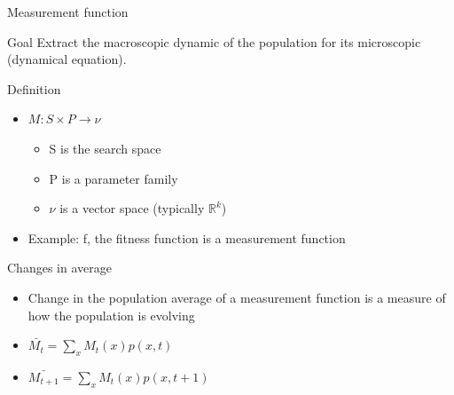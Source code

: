 \begin{frame}{Measurement function}
  \begin{block}{Goal}
    Extract the macroscopic dynamic of the population for its microscopic (dynamical equation).
  \end{block}

  \begin{block}{Definition}
    \begin{itemize}
    \item$M: S \times P \longrightarrow \nu$
      \begin{itemize}
        \item S is the search space
        \item P is a parameter family
        \item $\nu$ is a vector space (typically $\mathbb{R}^k$)
      \end{itemize}
    \item Example: f, the fitness function is a measurement function
    \end{itemize}
  \end{block}

  \begin{block}{Changes in average}
    \begin{itemize}
    \item Change in the population average of a measurement function is a measure of how the population is evolving
    \item $\bar{M_t} = \sum\limits_{x} M_t(x)p(x,t)$
    \item $\bar{M_{t+1}} = \sum\limits_{x} M_t(x)p(x,t+1)$
    \end{itemize}
  \end{block}
\end{frame}

